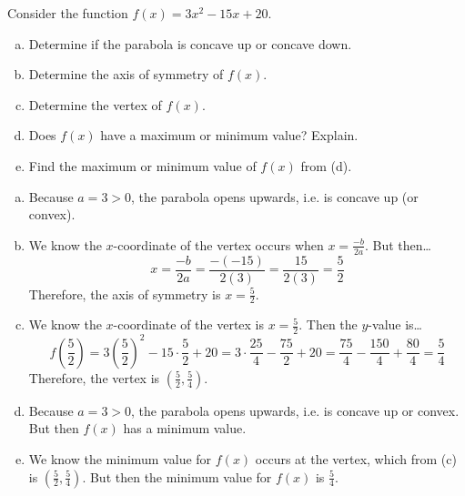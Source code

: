 \documentclass[12pt,letterpaper]{exam}
\begin{document}
\begin{questions}
\newpage



\newpage
\question[10] Consider the function $f(x)= 3x^2 - 15x + 20$. 
	\begin{enumerate}[(a)]
	\item Determine if the parabola is concave up or concave down. 
	\item Determine the axis of symmetry of $f(x)$. 
	\item Determine the vertex of $f(x)$.
	\item Does $f(x)$ have a maximum or minimum value? Explain. 
	\item Find the maximum or minimum value of $f(x)$ from (d).  
	\end{enumerate} \pspace

{ \itshape
\begin{enumerate}[(a)]
\item Because $a= 3 > 0$, the parabola opens upwards, i.e. is concave up (or convex). \pspace

\item We know the $x$-coordinate of the vertex occurs when $x= \frac{-b}{2a}$. But then\dots
	\[
	x= \dfrac{-b}{2a}= \dfrac{-(-15)}{2(3)}= \dfrac{15}{2(3)}= \dfrac{5}{2}
	\]
Therefore, the axis of symmetry is $x= \frac{5}{2}$. \pspace

\item We know the $x$-coordinate of the vertex is $x= \frac{5}{2}$. Then the $y$-value is\dots
	\[
	f\left(\frac{5}{2}\right)= 3\left( \dfrac{5}{2} \right)^2 - 15 \cdot \dfrac{5}{2} + 20= 3 \cdot \dfrac{25}{4} - \dfrac{75}{2} + 20= \dfrac{75}{4} - \dfrac{150}{4} + \dfrac{80}{4}= \dfrac{5}{4}
	\]
Therefore, the vertex is $(\frac{5}{2}, \frac{5}{4})$. \pspace

\item Because $a= 3 > 0$, the parabola opens upwards, i.e. is concave up or convex. But then $f(x)$ has a minimum value. \pspace

\item We know the minimum value for $f(x)$ occurs at the vertex, which from (c) is $(\frac{5}{2}, \frac{5}{4})$. But then the minimum value for $f(x)$ is $\frac{5}{4}$. 
\end{enumerate}
}


\end{questions}
\end{document}
